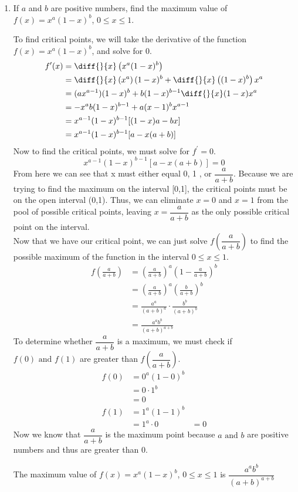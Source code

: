 \documentclass{article}
\begin{document}
\begin{enumerate}[label=\textbf{(13.\arabic*)}]

\item If $a$ and $b$ are positive numbers, find the maximum value of $f(x)=x^a(1-x)^b$, $0\le x\le 1$.

To find critical points, we will take the derivative of the function $f(x)=x^a(1-x)^b$, and solve for 0.
\begin{align*}
f^\prime(x)&=\diff{ }{x}\left(x^a(1-x)^b\right) \\
&=\diff{ }{x}\left(x^a\right)(1-x)^b+\diff{ }{x}\left((1-x)^b\right)x^a \\
&=(ax^{a-1})(1-x)^b+b(1-x)^{b-1}\diff{ }{x}(1-x)x^a \\
&=-x^ab(1-x)^{b-1}+a(x-1)^bx^{a-1} \\
&=x^{a-1}(1-x)^{b-1}[(1-x)a-bx] \\
&=x^{a-1}(1-x)^{b-1}[a-x(a+b)] \\
\end{align*}
Now to find the critical points, we must solve for $f^\prime=0$.
\[x^{a-1}(1-x)^{b-1}[a-x(a+b)]=0\]
From here we can see that x must either equal 0, 1 , or $\dfrac{a}{a+b}$. Because we are trying to find the maximum on the interval [0,1], the critical points must be on the open interval (0,1). Thus, we can eliminate $x=0$ and $x=1$ from the pool of possible critical points, leaving $x=\dfrac{a}{a+b}$ as the only possible critical point on the interval.\\
Now that we have our critical point, we can just solve $f(\dfrac{a}{a+b})$ to find the possible maximum of the function in the interval $0\le x\le 1$.
\begin{align*}
f\left(\frac{a}{a+b}\right)&={\left(\frac{a}{a+b}\right)}^a{\left(1-\frac{a}{a+b}\right)}^b \\
&={\left(\frac{a}{a+b}\right)}^a{\left(\frac{b}{a+b}\right)}^b \\
&= \frac{a^a}{{\left(a+b\right)}^a}\cdot\frac{b^b}{{\left(a+b\right)}^b} \\
&=\frac{a^ab^b}{{\left(a+b\right)}^{a+b}}
\end{align*}
To determine whether $\dfrac{a}{a+b}$ is a maximum, we must check if $f(0) \text{ and } f(1)$ are greater than $f\left(\dfrac{a}{a+b}\right)$.
\begin{align*}
f(0)&=0^a(1-0)^b \\
&=0\cdot1^b \\
&=0 \\
f(1)&=1^a(1-1)^b \\
&=1^a\cdot0
&=0
\end{align*}
Now we know that $\dfrac{a}{a+b}$ is the maximum point because $a \text{ and } b$ are positive numbers and thus are greater than 0.
\begin{tcolorbox}[colback=white]
The maximum value of  $f(x)=x^a(1-x)^b$, $0\le x\le 1$ is $\dfrac{a^ab^b}{{\left(a+b\right)}^{a+b}}$
\centering
\end{tcolorbox}


\end{enumerate}
\end{document}
